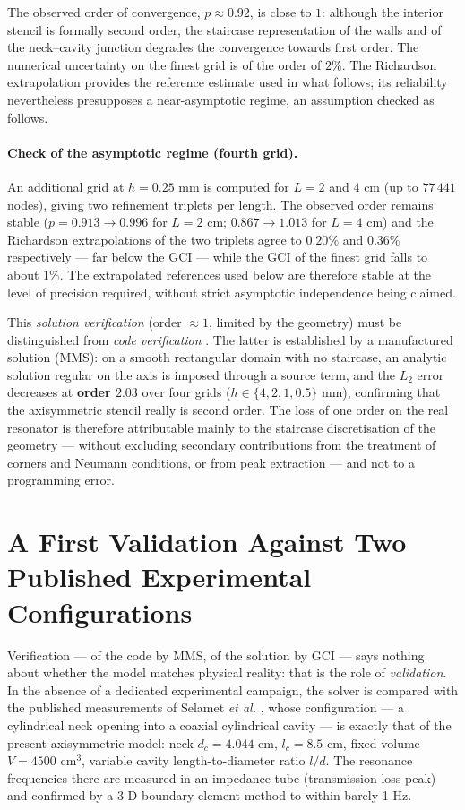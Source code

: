 \documentclass[11pt,a4paper,twocolumn]{article}
\begin{document}
The observed order of convergence, $p \approx 0.92$, is close to $1$: although the interior stencil is formally second order, the staircase representation of the walls and of the neck--cavity junction degrades the convergence towards first order. The numerical uncertainty on the finest grid is of the order of $2\%$. The Richardson extrapolation provides the reference estimate used in what follows; its reliability nevertheless presupposes a near-asymptotic regime, an assumption checked as follows.

\paragraph{Check of the asymptotic regime (fourth grid).} An additional grid at $h=0.25$ mm is computed for $L=2$ and $4$ cm (up to $77\,441$ nodes), giving two refinement triplets per length. The observed order remains stable ($p = 0.913 \to 0.996$ for $L=2$ cm; $0.867 \to 1.013$ for $L=4$ cm) and the Richardson extrapolations of the two triplets agree to $0.20\%$ and $0.36\%$ respectively --- far below the GCI --- while the GCI of the finest grid falls to about $1\%$. The extrapolated references used below are therefore stable at the level of precision required, without strict asymptotic independence being claimed.

This \emph{solution verification} (order $\approx 1$, limited by the geometry) must be distinguished from \emph{code verification} \cite{roache1998verification}. The latter is established by a manufactured solution (MMS): on a smooth rectangular domain with no staircase, an analytic solution regular on the axis is imposed through a source term, and the $L_2$ error decreases at \textbf{order $2.03$} over four grids ($h \in \{4, 2, 1, 0.5\}$ mm), confirming that the axisymmetric stencil really is second order. The loss of one order on the real resonator is therefore attributable mainly to the staircase discretisation of the geometry --- without excluding secondary contributions from the treatment of corners and Neumann conditions, or from peak extraction --- and not to a programming error.

\section{A First Validation Against Two Published Experimental Configurations}
\label{sec:validation}
Verification --- of the code by MMS, of the solution by GCI --- says nothing about whether the model matches physical reality: that is the role of \emph{validation}. In the absence of a dedicated experimental campaign, the solver is compared with the published measurements of Selamet \emph{et al.} \cite{selamet1997circular}, whose configuration --- a cylindrical neck opening into a coaxial cylindrical cavity --- is exactly that of the present axisymmetric model: neck $d_c = 4.044$ cm, $l_c = 8.5$ cm, fixed volume $V = 4500\text{ cm}^3$, variable cavity length-to-diameter ratio $l/d$. The resonance frequencies there are measured in an impedance tube (transmission-loss peak) and confirmed by a 3-D boundary-element method to within barely 1 Hz.
\end{document}
